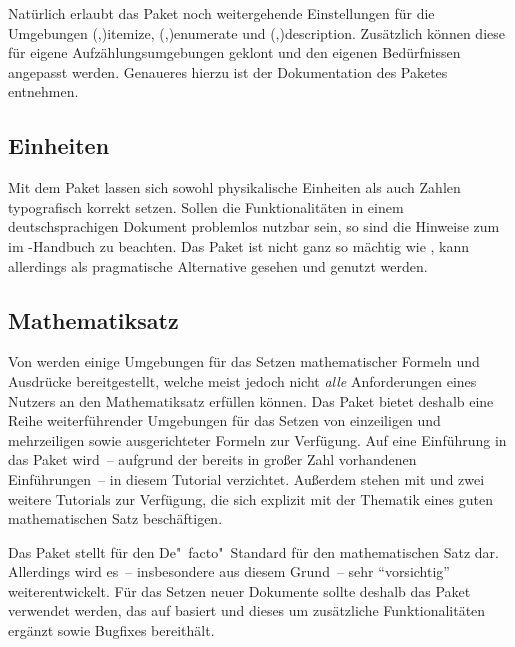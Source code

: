 \documentclass[%
  english,ngerman,%
  cdgeometry=no,DIV=12,%
  cd=false,cdfont=false,cdtitle=true,%
  headings=normal,%
  automark,%
  listof=toc,%
]{tudscrartcl}
\begin{document}
Natürlich erlaubt das Paket noch weitergehende Einstellungen für die Umgebungen 
\Environment(,){itemize},
\Environment(,){enumerate} und
\Environment(,){description}. 
Zusätzlich können diese für eigene Aufzählungsumgebungen geklont und den 
eigenen Bedürfnissen angepasst werden. Genaueres hierzu ist der Dokumentation 
des Paketes  entnehmen.


\subsection{Einheiten}

Mit dem Paket  lassen sich sowohl physikalische Einheiten als 
auch Zahlen typografisch korrekt setzen. Sollen die Funktionalitäten in einem 
deutschsprachigen Dokument problemlos nutzbar sein, so sind die Hinweise zum 
 im 
\TUDScript-Handbuch zu beachten. Das Paket  ist nicht ganz so 
mächtig wie , kann allerdings als pragmatische Alternative 
gesehen und genutzt werden.


\subsection{Mathematiksatz}

Von  werden einige Umgebungen für das Setzen mathematischer 
Formeln und Ausdrücke bereitgestellt, welche meist jedoch nicht \emph{alle} 
Anforderungen eines Nutzers an den Mathematiksatz erfüllen können. Das Paket
 bietet deshalb eine Reihe weiterführender Umgebungen für das 
Setzen von einzeiligen und mehrzeiligen sowie ausgerichteter Formeln zur 
Verfügung. Auf eine Einführung in das Paket wird~-- aufgrund der bereits in 
großer Zahl vorhandenen Einführungen~-- in diesem Tutorial verzichtet. Außerdem 
stehen mit  und  zwei weitere Tutorials 
zur Verfügung, die sich explizit mit der Thematik eines guten mathematischen 
Satz beschäftigen.

Das Paket  stellt für  den 
De"~facto"~Standard für den mathematischen Satz dar. Allerdings wird es~-- 
insbesondere aus diesem Grund~-- sehr \enquote{vorsichtig} weiterentwickelt. 
Für das Setzen neuer Dokumente sollte deshalb das Paket  
verwendet werden, das auf  basiert und dieses um zusätzliche 
Funktionalitäten ergänzt sowie Bugfixes bereithält.
\end{document}

